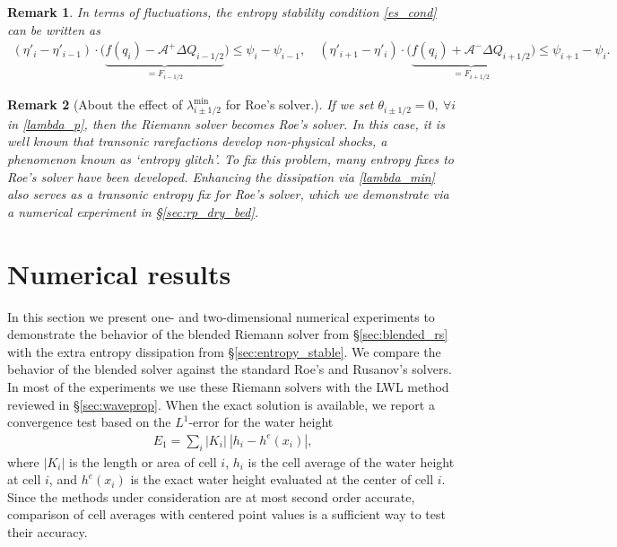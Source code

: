 \documentclass[preprint, 11pt]{article}
\newcommand{\A}{{\mathcal A}}
\newcommand{\bff}{{f}}
\newcommand{\bfF}{{F}}
\newcommand{\entvar}{\eta'}
\newcommand{\bfq}{{q}}
\newcommand{\bfx}{{x}}
\newcommand{\efp}{\psi}
\newtheorem{remark}{Remark}
\begin{document}
\begin{remark}
In terms of fluctuations, the entropy stability condition \eqref{es_cond} can be written as
\begin{align*}
  (\entvar_{i}-\entvar_{i-1})\cdot
  \Big(
  \underbrace{\bff(\bfq_i)-\A^+\Delta Q_{i-1/2}}_{=\bfF_{i-1/2}}\Big)\leq \efp_{i}-\efp_{i-1},
  \quad
  (\entvar_{i+1}-\entvar_i)\cdot
  \Big(\underbrace{\bff(\bfq_i)+\A^-\Delta Q_{i+1/2}}_{=\bfF_{i+1/2}}\Big)\leq \efp_{i+1}-\efp_i.
\end{align*}
\end{remark}

\begin{remark}[About the effect of $\lambda_{i\pm 1/2}^{\min}$ for Roe's solver.]
  If we set $\theta_{i\pm 1/2}=0, ~\forall i$ in \eqref{lambda_p}, then the Riemann solver becomes Roe's solver.
  In this case, it is well known that transonic rarefactions develop non-physical shocks,
  a phenomenon known as `entropy glitch'. To fix this problem, many entropy fixes to Roe's
  solver have been developed. Enhancing the dissipation via \eqref{lambda_min}
  also serves as a transonic entropy fix for Roe's solver, which we demonstrate
  via a numerical experiment in \S \ref{sec:rp_dry_bed}.
\end{remark}

\clearpage
\section{Numerical results}\label{sec:num}
In this section we present one- and two-dimensional numerical experiments to demonstrate the behavior of the
blended Riemann solver from \S\ref{sec:blended_rs} with the extra entropy dissipation from \S\ref{sec:entropy_stable}.
We compare the behavior of the blended solver against the standard Roe's and Rusanov's solvers.
In most of the experiments we use these Riemann solvers with the LWL method reviewed in \S\ref{sec:waveprop}.
When the exact solution is available, we report a convergence test based on the $L^1$-error for the water height
\begin{align*}
  E_1=\sum_i|K_i|~|h_i-h^e(\bfx_i)|,
\end{align*}
where $|K_i|$ is the length or area of cell $i$,
$h_i$ is the cell average of the water height at cell $i$,
and $h^e(\bfx_i)$ is the exact water height evaluated at the center of cell $i$.
Since the methods under consideration are at most second order accurate, comparison
of cell averages with centered point values is a sufficient way to test their accuracy.
\end{document}
